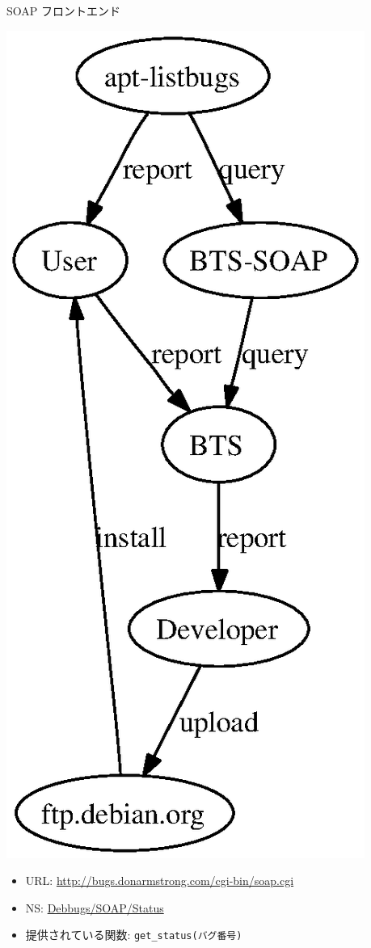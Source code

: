\documentclass[cjk,dvipdfmx]{beamer}
\begin{document}
\begin{frame}[containsverbatim]{SOAP フロントエンド}
\begin{minipage}[b]{0.35\hsize}
 \includegraphics[width=0.7\hsize]{image200611/bugstruct.eps}
\end{minipage}
\begin{minipage}[b]{0.6\hsize}
  \begin{itemize}
  \item URL: \url{http://bugs.donarmstrong.com/cgi-bin/soap.cgi} 
  \item NS: \url{Debbugs/SOAP/Status}
  \item 提供されている関数: \verb!get_status(バグ番号)!
 \end{itemize}
\end{minipage}
\end{frame}
\end{document}

